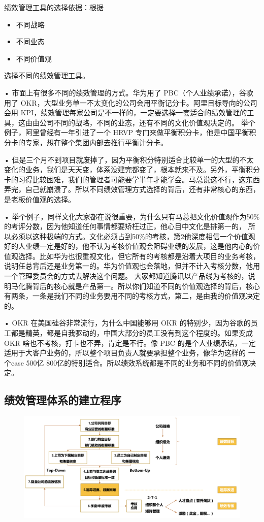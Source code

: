 \documentclass[12pt]{article}
\begin{document}
绩效管理工具的选择依据：根据
\begin{itemize}
\setlength{\itemsep}{0pt}
\setlength{\parsep}{0pt}
\setlength{\parskip}{0pt}
    \item 不同战略
    \item 不同业态
    \item 不同价值观
\end{itemize}

选择不同的绩效管理工具。

• 市面上有很多不同的绩效管理的方式。华为用了 PBC（个人业绩承诺），谷歌用了 OKR，大型业务单一不太变化的公司会用平衡记分卡。阿里目标导向的公司会用 KPI，绩效管理每家公司是不一样的，一定要选择一套适合的绩效管理的工具，这由由公司不同的战略，不同的业态，还有不同的文化价值观决定的。 举个例子，阿里曾经有一年引进了一个 HRVP 专门来做平衡积分卡，他是中国平衡积分卡的专家，想在整个集团内部去推行平衡计分卡。

• 但是三个月不到项目就废掉了，因为平衡积分特别适合比较单一的大型的不太变化的业务，我们是天天变，体系没建完都变了，根本就来不及。另外，平衡积分卡的习得比较困难，我们的管理者可能要学半年才能学会。马总说这不行，这东西弄完，自己就崩溃了。所以不同绩效管理方式选择的背后，还有非常核心的东西，是老板价值观的选择。

• 举个例子，同样文化大家都在说很重要，为什么只有马总把文化价值观作为50\%的考评分数，因为他知道任何事情都要矫枉过正，他心目中文化是排第一的， 所以必须以这种极端的方式。文化必须占到50\%的考核，第2他深度相信一个价值观好的人业绩一定是好的，他不认为考核价值观会阻碍业绩的发展，这是他内心的价值观选择。比如华为也很重视文化，但它所有的考核都是沿着大项目的业务考核，说明任总背后还是业务第一的。华为价值观也会落地，但并不计入考核分数，他用一个管理委员会的方式去解决这个问题。 大家都知道腾讯以产品线为考核的，说明马化腾背后的核心就是产品第一。所以你们知道不同的价值观选择的背后，核心有两条，一条是我们不同的业务要用不同的考核方式，第二，是由我的价值观决定的。

• OKR 在美国硅谷非常流行，为什么中国能够用 OKR 的特别少，因为谷歌的员工都是精英，都是自我驱动的，中国大部分的员工没有到这个程度的。如果变成 OKR 啥也不考核，打卡也不弄，肯定是不行。像 PBC 的是个人业绩承诺，一定适用于大客户业务的，所以整个项目负责人就要承担整个业务，像华为这样的 一个case 500亿 800亿的特别适合。所以绩效系统都是不同的业务和不同的价值观决定。

\subsection{绩效管理体系的建立程序}
\begin{figure}[H]
    \centering
    \includegraphics[width=.6\textwidth]{fig/Ali_Performance_3.png}
\end{figure}
\end{document}
